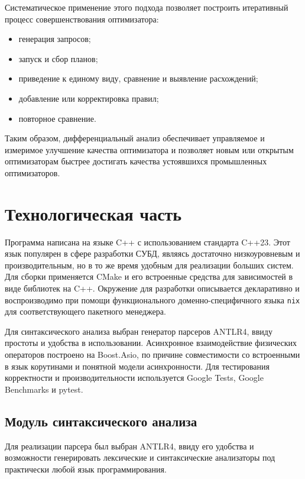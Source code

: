 \documentclass[14pt, russian]{scrartcl}
\begin{document}
Систематическое применение этого подхода позволяет построить итеративный процесс
совершенствования оптимизатора:

\begin{itemize}
  \item генерация запросов;
  \item запуск и сбор планов;
  \item приведение к единому виду, сравнение и выявление расхождений;
  \item добавление или корректировка правил;
  \item повторное сравнение.
\end{itemize}

Таким образом, дифференциальный анализ обеспечивает управляемое и измеримое
улучшение качества оптимизатора и позволяет новым или открытым оптимизаторам
быстрее достигать качества устоявшихся промышленных оптимизаторов.




\section{Технологическая часть}

Программа написана на языке C++ с использованием стандарта C++23. Этот язык
популярен в сфере разработки СУБД, являясь достаточно низкоуровневым и
производительным, но в то же время удобным для реализации больших систем. Для
сборки применяется CMake и его встроенные средства для зависимостей в виде
библиотек на C++. Окружение для разработки описывается декларативно и
воспроизводимо при помощи функционального доменно-специфичного языка \verb|nix|
для соответствующего пакетного менеджера.

Для синтаксического анализа выбран генератор парсеров ANTLR4, ввиду простоты и
удобства в использовании. Асинхронное взаимодействие физических операторов
построено на Boost.Asio, по причине совместимости со встроенными в язык
корутинами и понятной модели асинхронности. Для тестирования корректности и
производительности используется Google Tests, Google Benchmarks и pytest.

\subsection{Модуль синтаксического анализа}

Для реализации парсера был выбран ANTLR4, ввиду его удобства и возможности
генерировать лексические и синтаксические анализаторы под практически любой язык
программирования.
\end{document}
